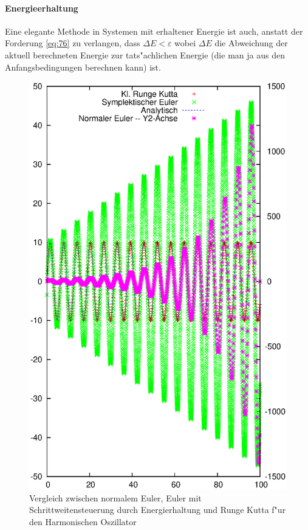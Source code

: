 \documentclass[a4paper]{book}
\begin{document}
\paragraph{Energieerhaltung}
\label{sec:energieerhaltung-1}

Eine elegante Methode in Systemen mit erhaltener Energie ist auch,
anstatt der Forderung \eqref{eq:76} zu verlangen, dass $\Delta E <
\varepsilon$ wobei $\Delta E$ die Abweichung der aktuell berechneten
Energie zur tats"achlichen Energie (die man ja aus den
Anfangsbedingungen berechnen kann) ist.

\begin{figure}
  \centering
  \includegraphics[width=\textwidth]{bilder/vorteil-symplekt-1}
  \caption{Vergleich zwischen normalem Euler, Euler mit Schrittweitensteuerung durch Energierhaltung und Runge Kutta f"ur den Harmonischen Oszillator}
  \label{fig:schrittw-euler}
\end{figure}
\end{document}
